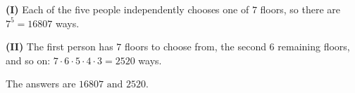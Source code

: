 \textbf{(I)} Each of the five people independently chooses one of $7$ floors, so there are $7^5=16807$ ways.

\textbf{(II)} The first person has $7$ floors to choose from, the second $6$ remaining floors, and so on: $7\cdot6\cdot5\cdot4\cdot3=2520$ ways.

The answers are $\boxed{16807\text{ and }2520}$.
